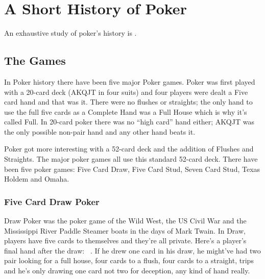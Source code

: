 \chapter{A Short History of Poker}

An exhaustive study of poker's history is \citet{McManus}.

\section{The Games}

In Poker history there have been five major Poker games.
Poker was first played with a 20-card deck (AKQJT in four suits) and
four players were dealt a Five card hand and that was it. There were no
flushes or straights; the only hand to use the full five cards as a
Complete Hand was a Full House which is why it's called Full. In
20-card poker there was no ``high card'' hand either; AKQJT was the
only possible non-pair hand and any other hand beats it.

Poker got more interesting with a 52-card deck and the addition of
Flushes and Straights. The major poker games all use this standard
52-card deck. There have been five poker games: Five Card Draw, Five
Card Stud, Seven Card Stud, Texas Holdem and Omaha.



\subsection{Five Card Draw Poker}

Draw Poker was the poker game of the Wild West, the US Civil War and
the Mississippi River Paddle Steamer boats in the days of Mark Twain.
In Draw, players have five cards to themselves and they're
all private. Here's a player's final hand after the draw:
\back\back\back\back\back\ . If he drew one card in his draw,
he might've had two pair looking for a full house, four cards to a
flush, four cards to a straight, trips and he's only drawing one card
not two for deception, any kind of hand really.

